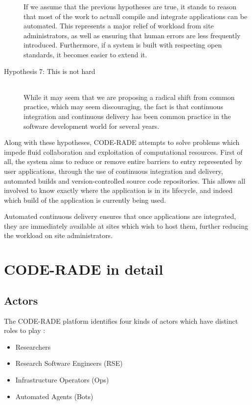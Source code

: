 \documentclass[a4paper]{jpconf}
\begin{document}
\begin{description}
		If we assume that the previous hypotheses are true, it stands to reason that most of the work to actuall compile and integrate applications can be automated. This represents a major relief of workload from site administrators, as well as ensuring that human errors are less frequently introduced. Furthermore, if a system is built with respecting open standards, it becomes easier to extend it.
		\item[Hypothesis 7: This is not hard] \hfill \\
		While it may seem that we are proposing a radical shift from common practice, which may seem discouraging, the fact is that continuous integration\cite{ContinuousIntegration} and continuous delivery\cite{ContinuousDelivery} has been common practice in the software development world for several years.
	\end{description}

	Along with these hypotheses, CODE-RADE attempts  to solve problems which impede fluid collaboration and exploitation of computational resources. First of all, the system aims to reduce or remove entire barriers to entry represented by user applications, through the use of continuous integration and delivery, automated builds and version-controlled source code repositories. This allows all involved to know exactly where the application is in its lifecycle, and indeed which build of the application is currently being used.

	Automated continuous delivery ensures that once applications are integrated, they are immediately available at sites which wish to host them, further reducing the workload on site administrators.

	\section{CODE-RADE in detail}

	\subsection{Actors}

	The CODE-RADE platform identifies four kinds of actors which have distinct roles to play :
	\begin{itemize}
		\item Researchers
		\item Research Software Engineers (RSE)
		\item Infrastructure Operators (Ops)
		\item Automated Agents (Bots)
	\end{itemize}
\end{document}
